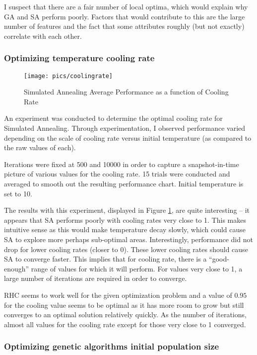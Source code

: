 \documentclass[12pt]{article}
\begin{document}
I suspect that there are a fair number of local optima, which would explain why GA and SA perform poorly. Factors that would contribute to this are the large number of features and the fact that some attributes roughly (but not exactly) correlate with each other.


\subsubsection{Optimizing temperature cooling rate}

\begin{figure}[h!]
    \texttt{[image: pics/coolingrate]}
    \caption{Simulated Annealing Average Performance as a function of Cooling Rate}
    \label{fig:coolingrate}
\end{figure}

An experiment was conducted to determine the optimal cooling rate for Simulated Annealing. Through experimentation, I observed performance varied depending on the scale of cooling rate versus initial temperature (as compared to the raw values of each).

Iterations were fixed at 500 and 10000 in order to capture a snapshot-in-time picture of various values for the cooling rate. 15 trials were conducted and averaged to smooth out the resulting performance chart. Initial temperature is set to 10.

The results with this experiment, displayed in Figure \ref{fig:coolingrate}, are quite interesting – it appears that SA performs poorly with cooling rates very close to 1. This makes intuitive sense as this would make temperature decay slowly, which could cause SA to explore more perhaps sub-optimal areas. Interestingly, performance did not drop for lower cooling rates (closer to 0). These lower cooling rates should cause SA to converge faster. This implies that for cooling rate, there is a “good-enough” range of values for which it will perform. For values very close to 1, a large number of iterations are required in order to converge.

RHC seems to work well for the given optimization problem and a value of $0.95$ for the cooling value seems to be optimal as it has more room to grow but still converges to an optimal solution relatively quickly. As the number of iterations, almost all values for the cooling rate except for those very close to 1 converged.


\subsubsection{Optimizing genetic algorithms initial population size}
\end{document}
